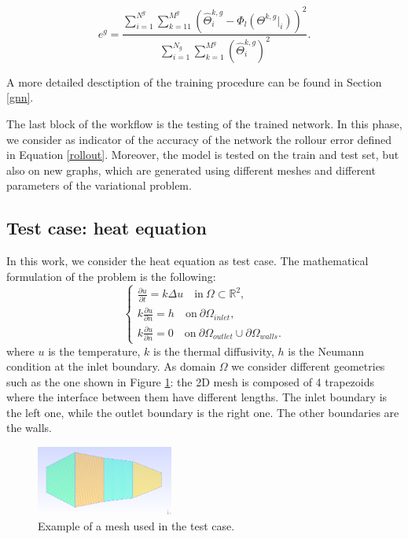 \documentclass[11pt,a4paper]{article}
\begin{document}
\begin{equation}
    e^g = \frac{ \sum_{i=1}^{N^g} \sum_{k=11}^{M^g} (\hat{\Theta}_i^{k,g} -  \Phi_l(\Theta^{k,g}|_i))^2 }{ \sum_{i=1}^{N_g} \sum_{k=1}^{M^g} (\hat{\Theta}_i^{k,g})^2 }.
    \label{rollout}
\end{equation}

A more detailed desctiption of the training procedure can be found in Section \ref{gnn}. 

The last block of the workflow is the testing of the trained network. In this phase, we consider as indicator of the accuracy of the network the rollour error defined in Equation \eqref{rollout}. 
Moreover, the model is tested on the train and test set, but also on new graphs, which are generated using different meshes and different parameters of the variational problem. 


\subsection{Test case: heat equation}
\label{testcase}

In this work, we consider the heat equation as test case. 
The mathematical formulation of the problem is the following:
\begin{equation}
    \begin{cases}
        \frac{\partial u }{\partial t} = k \Delta u \quad \text{in} \ \Omega \subset \mathbb{R}^2, \\
        k \frac{\partial u}{\partial n} = h \quad \text{on} \ \partial \Omega_{inlet}, \\
        k \frac{\partial u}{\partial n} = 0 \quad \text{on} \ \partial \Omega_{outlet} 
        \cup \partial \Omega_{walls}.
    \end{cases}
\end{equation}
where \(u\) is the temperature, \(k\) is the thermal diffusivity, \(h\) is the Neumann condition at the inlet boundary. As domain \(\Omega\) we consider different geometries such as the one shown in Figure \ref{mesh}: the 2D mesh is composed of 4 trapezoids where the interface between them have different lengths. The inlet boundary is the left one, while the outlet boundary is the right one. The other boundaries are the walls.

\begin{figure}[H]
    \centering
    \includegraphics[width=0.4\textwidth]{Images/mesh.png}
    \caption{Example of a mesh used in the test case.}
    \label{mesh}
\end{figure}
\end{document}
